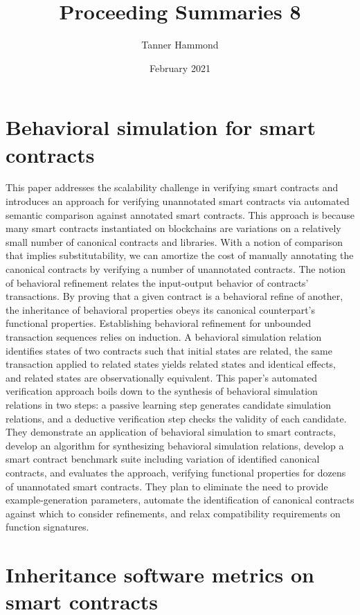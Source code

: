 \documentclass{article}
\title{Proceeding Summaries 8}
\author{Tanner Hammond}
\date{February 2021}
\begin{document}
\maketitle

\section{Behavioral simulation for smart contracts \cite{Behavior}}

This paper addresses the scalability challenge in verifying smart contracts and introduces an approach for verifying unannotated smart contracts via automated semantic comparison against annotated smart contracts. This approach is because many smart contracts instantiated on blockchains are variations on a relatively small number of canonical contracts and libraries. With a notion of comparison that implies substitutability, we can amortize the cost of manually annotating the canonical contracts by verifying a number of unannotated contracts. The notion of behavioral refinement relates the input-output behavior of contracts' transactions. By proving that a given contract is a behavioral refine of another, the inheritance of behavioral properties obeys its canonical counterpart's functional properties. Establishing behavioral refinement for unbounded transaction sequences relies on induction. A behavioral simulation relation identifies states of two contracts such that initial states are related, the same transaction applied to related states yields related states and identical effects, and related states are observationally equivalent. This paper's automated verification approach boils down to the synthesis of behavioral simulation relations in two steps: a passive learning step generates candidate simulation relations, and a deductive verification step checks the validity of each candidate. They demonstrate an application of behavioral simulation to smart contracts, develop an algorithm for synthesizing behavioral simulation relations, develop a smart contract benchmark suite including variation of identified canonical contracts, and evaluates the approach, verifying functional properties for dozens of unannotated smart contracts. They plan to eliminate the need to provide example-generation parameters, automate the identification of canonical contracts against which to consider refinements, and relax compatibility requirements on function signatures. 

\section{Inheritance software metrics on smart contracts \cite{Inheri}}
\end{document}

